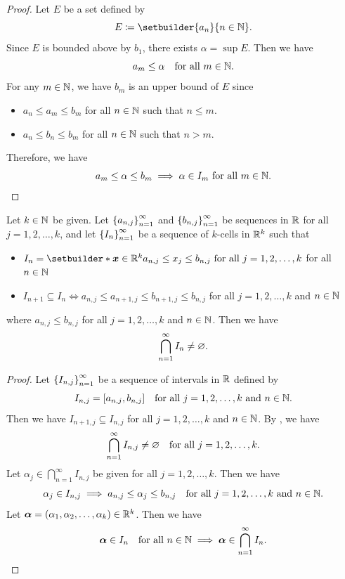 \begin{proof}
    Let $E$ be a set defined by
    \[
    E \coloneqq \setbuilder{a_{n}}{n \in \N}.
    \]
    Since $E$ is bounded above by $b_{1}$, there exists $\alpha = \sup E$. Then we have
    \[
    a_{m} \leq \alpha \quad \text{for all } m \in \N.
    \]
    For any $m \in \N$, we have $b_{m}$ is an upper bound of $E$ since
    \begin{itemize}
        \item $a_{n} \leq a_{m} \leq b_{m}$ for all $n \in \N$ such that $n \leq m$.
        \item $a_{n} \leq b_{n} \leq b_{m}$ for all $n \in \N$ such that $n > m$.
    \end{itemize}
    Therefore, we have
    \[
    a_{m} \leq \alpha \leq b_{m} \implies \alpha \in I_{m} \text{ for all } m \in \N.
    \]
\end{proof}

\bigskip

\begin{theorem} \label{thm:NestedKCells}
    Let $k \in \N$ be given. Let $\set*{a_{n, j}}_{n = 1}^{\infty}$ and $\set*{b_{n, j}}_{n = 1}^{\infty}$ be sequences
    in $\R$ for all $j = 1, 2, \dots, k$, and let $\set*{I_{n}}_{n = 1}^{\infty}$ be a sequence of $k$-cells in $\R^{k}$
    such that
    \begin{itemize}
        \item $I_{n} = \setbuilder*{\bm{x} \in \R^{k}}{a_{n, j} \leq x_{j} \leq b_{n, j}
        \text{ for all } j = 1, 2, \dots, k}$ for all $n \in \N$
        \item $I_{n + 1} \subseteq I_{n} \iff a_{n, j} \leq a_{n + 1, j} \leq b_{n + 1, j} \leq b_{n, j}$
        for all $j = 1, 2, \dots, k$ and $n \in \N$
    \end{itemize}
    where $a_{n, j} \leq b_{n, j}$ for all $j = 1, 2, \dots, k$ and $n \in \N$. Then we have
    \[
    \bigcap_{n = 1}^{\infty} I_{n} \neq \vnot.
    \]
\end{theorem}

\begin{proof}
    Let $\set*{I_{n, j}}_{n = 1}^{\infty}$ be a sequence of intervals in $\R$ defined by
    \[
    I_{n, j} = [a_{n, j}, b_{n, j}] \quad \text{for all } j = 1, 2, \dots, k \text{ and } n \in \N.
    \]
    Then we have $I_{n + 1, j} \subseteq I_{n, j}$ for all $j = 1, 2, \dots, k$
    and $n \in \N$. By , we have
    \[
    \bigcap_{n = 1}^{\infty} I_{n, j} \neq \vnot \quad \text{for all } j = 1, 2, \dots, k.
    \]
    Let $\alpha_{j} \in \displaystyle \bigcap_{n = 1}^{\infty} I_{n, j}$ be given for all $j = 1, 2, \dots, k$. Then we have
    \[
    \alpha_{j} \in I_{n, j} \implies a_{n, j} \leq \alpha_{j} \leq b_{n, j} \quad \text{for all }
    j = 1, 2, \dots, k \text{ and } n \in \N.
    \]
    Let $\bm{\alpha} = (\alpha_{1}, \alpha_{2}, \dots, \alpha_{k}) \in \R^{k}$. Then we have
    \[
    \bm{\alpha} \in I_{n} \quad \text{for all } n \in \N \implies \bm{\alpha} \in \bigcap_{n = 1}^{\infty} I_{n}.
    \]
\end{proof}

